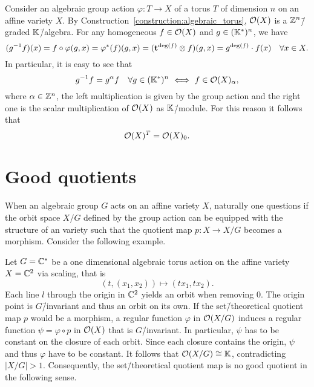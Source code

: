 \begin{ex}
	\label{example:regular_functions_torus_group_action}
	Consider an algebraic group action $\varphi\colon T \rightarrow X$ of a torus $T$ of dimension $n$ on an affine variety $X$. By Construction~\ref{construction:algebraic_torus}, $\mathcal{O}(X)$ is a $\mathbb{Z}^n$\=/graded $\mathbb{K}$\=/algebra. For any homogeneous $f\in\mathcal{O}(X)$ and $g\in (\mathbb{K}^*)^n$, we have
	$$(g^{-1}f)(x) = f \circ \varphi(g,x) = \varphi^*(f)(g,x) = (\mathbf{t}^{\deg(f)} \otimes f)(g,x) = g^{\deg(f)}\cdot f(x)\quad \forall x\in X.$$
	In particular, it is easy to see that
	$$g^{-1}f = g^\alpha f\quad \forall g\in (\field^*)^n \ \Longleftrightarrow \ f\in\O(X)_\alpha,$$
	where $\alpha\in\mathbb{Z}^n$, the left multiplication is given by the group action and the right one is the scalar multiplication of $\mathcal{O}(X)$ as $\mathbb{K}$\=/module.
	For this reason it follows that
	$$ \mathcal{O}(X)^T = \mathcal{O}(X)_0.$$
\end{ex}

\section{Good quotients}
When an algebraic group $G$ acts on an affine variety $X$, naturally one questions if the orbit space $X/G$ defined by the group action can be equipped with the structure of an variety such that the quotient map $p\colon X\rightarrow X/G$ becomes a morphism. Consider the following example.

\begin{ex}
	\label{example:bad_quotient}
	Let $G=\mathbb{C}^*$ be a one dimensional algebraic torus action on the affine variety $X = \mathbb{C}^2$ via scaling, that is
	$$(t,(x_1,x_2)) \mapsto (tx_1,tx_2).$$
	Each line $l$ through the origin in $\mathbb{C}^2$ yields an orbit when removing 0. The origin point is $G$\=/invariant and thus an orbit on its own.
	If the set\=/theoretical quotient map $p$ would be a morphism, a regular function $\varphi$ in $\mathcal{O}(X/G)$ induces a regular function $\psi = \varphi \circ p$ in $\mathcal{O}(X)$ that is $G$\=/invariant. In particular, $\psi$ has to be constant on the closure of each orbit. Since each closure contains the origin, $\psi$ and thus $\varphi$ have to be constant. It follows that $\mathcal{O}(X/G) \cong \mathbb{K}$, contradicting $|X/G| > 1$. Consequently, the set\=/theoretical quotient map is no good quotient in the following sense.
\end{ex}

